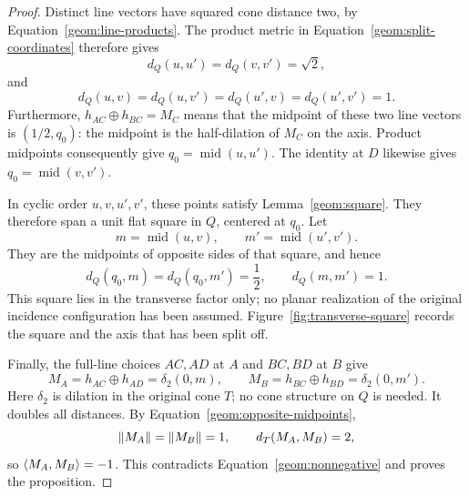 \begin{proof}
Distinct line vectors have squared cone distance two, by
Equation~\eqref{geom:line-products}.  The product metric in
Equation~\eqref{geom:split-coordinates} therefore gives
\[
 d_Q(u,u')=d_Q(v,v')=\sqrt2,
\]
and
\[
 d_Q(u,v)=d_Q(u,v')=d_Q(u',v)=d_Q(u',v')=1.
\]
Furthermore, $h_{AC}\oplus h_{BC}=M_C$ means that the midpoint
of these two line vectors is $(1/2,q_0)$: the midpoint is the
half-dilation of $M_C$ on the axis.  Product midpoints consequently
give $q_0=\operatorname{mid}(u,u')$.  The identity at $D$ likewise
gives $q_0=\operatorname{mid}(v,v')$.

In cyclic order $u,v,u',v'$, these points satisfy
Lemma~\ref{geom:square}.  They therefore span a unit flat square
in $Q$, centered at $q_0$.  Let
\[
 m=\operatorname{mid}(u,v),\qquad
 m'=\operatorname{mid}(u',v').
\]
They are the midpoints of opposite sides of that square, and hence
\begin{equation}
 d_Q(q_0,m)=d_Q(q_0,m')=\frac12,
 \qquad d_Q(m,m')=1.
 \label{geom:opposite-midpoints}
\end{equation}
This square lies in the transverse factor only; no planar realization
of the original incidence configuration has been assumed.
Figure~\ref{fig:transverse-square} records the square and the axis that
has been split off.



Finally, the full-line choices $AC,AD$ at $A$ and $BC,BD$ at $B$
give
\[
 M_A=h_{AC}\oplus h_{AD}=\delta_2(0,m),\qquad
 M_B=h_{BC}\oplus h_{BD}=\delta_2(0,m').
\]
Here $\delta_2$ is dilation in the original cone $T$; no cone
structure on $Q$ is needed.  It doubles all distances.  By
Equation~\eqref{geom:opposite-midpoints},
\[
 \lVert M_A\rVert=\lVert M_B\rVert=1,\qquad d_T(M_A,M_B)=2,
\]
so $\langle M_A,M_B\rangle=-1$.  This contradicts
Equation~\eqref{geom:nonnegative} and proves the proposition.
\end{proof}
